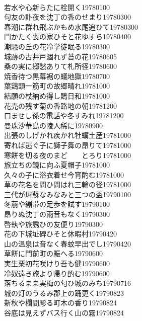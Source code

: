 \begin{multicols}{2}
\\若水や心新らたに栓開く\hfill{19780100}
\\句友の訃夜を沈丁の香のせまり\hfill{19780300}
\\春潮に群れ飛ぶかもめ水尾追ひて\hfill{19780300}
\\門かたく喪の家ひそと花ゆすら\hfill{19780400}
\\潮騒の丘の花冷学徒眠る\hfill{19780300}
\\城跡の古井戸涸れず苔の花\hfill{19780605}
\\桑の実に郷愁ありて札所径\hfill{19780600}
\\焼香待つ黒幕裾の蟻地獄\hfill{19780700}
\\葉鶏頭一筋町の故郷晴れ\hfill{19781000}
\\結願の杖納め得し鵙日和\hfill{19781000}
\\花売の残す菊の香路地の朝\hfill{19781200}
\\口ませし孫の電話や冬すみれ\hfill{19781200}
\\曼珠沙華島の陵人稀に\hfill{19780900}
\\出張のしげかれ疾かれ牡蠣土産\hfill{19781000}
\\寄れば逃ぐ子に獅子舞の昂りて\hfill{19781000}
\\寒餅を切る夜のまど　　とろり\hfill{19781000}
\\旅立ちの鏡に向ふ夏帽子\hfill{19781000}
\\久々の子に浴衣着せ今宵酌む\hfill{19781000}
\\草の花名を問ひ問はれ三輪の径\hfill{19781000}
\\三代が屠蘇なみなみと三つの盃\hfill{19790100}
\\冬萠や繃帯の足歩を試す\hfill{19790100}
\\昂りぬ沈丁の雨音もなく\hfill{19790300}
\\啓執や旅誘ひの友便り\hfill{19790300}
\\花の下城址碑ひそと休暇村\hfill{19790420}
\\山の温泉は音なく春蚊早出でし\hfill{19790420}
\\草餅に門前町の賑へる\hfill{19790600}
\\実生栗初花咲けり吾も健\hfill{19790600}
\\冷奴遠き旅より帰り酌む\hfill{19790600}
\\落ちるまま実梅の匂ひ城のみち\hfill{19790716}
\\城の灯のうるみ郡上の踊更く\hfill{19790823}
\\新秋や欄間彫る町木の香り\hfill{19790824}
\\谷底は見えずバス行く山の霧\hfill{19790824}

\end{multicols}
